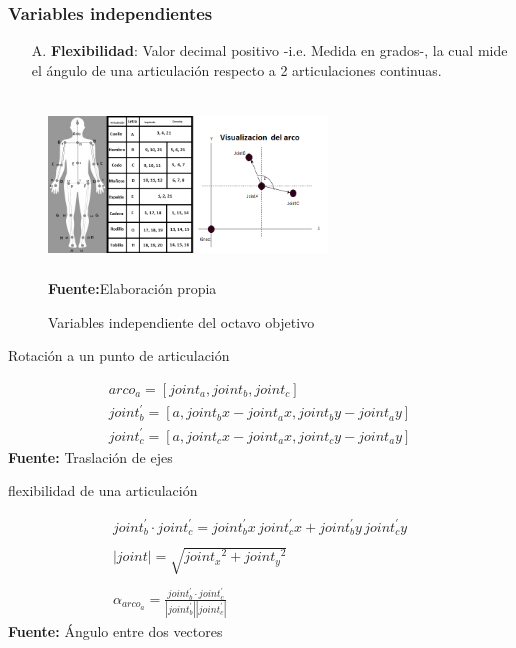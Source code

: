 \subsubsection{Variables independientes} \label{vr:8oi:indep}
\begin{enumerate}
	\item[A.] \textbf{Flexibilidad}: Valor decimal positivo -i.e. Medida en grados-, la cual mide el \'angulo de una articulaci\'on respecto a 2 articulaciones continuas.
\end{enumerate}	
\begin{figure}[H]
	\caption{Variables independiente del octavo  objetivo}
	\label{fig:varidep8}
	\centering
	\includegraphics[width=280px,height=180px]{graphics/EskeletanAngles.png} \\
	\textbf{Fuente:}Elaboraci\'on propia 
\end{figure}
\begin{formula}[h]
	\centering
	\caption{Rotaci\'on a un punto de articulaci\'on}
	\label{frm:rotEq}
	\begin{equation}
\begin{matrix}
arco_{a} = [joint_{a},joint_{b},joint_{c}]\\ 
joint_{b}^{'} = [a,joint_{b}x-joint_{a}x, joint_{b}y-joint_{a}y]\\ 
joint_{c}^{'} = [a,joint_{c}x-joint_{a}x, joint_{c}y-joint_{a}y]
\end{matrix}
	\end{equation}
	\textbf{Fuente:} Traslaci\'on de ejes \cite[p.~982]{aguilar2009matematicas}
\end{formula}  
\begin{formula}[h]
	\centering
	\caption{flexibilidad de una articulaci\'on}
	\label{frm:angleArc}
	\begin{equation}
\begin{matrix}
joint_{b}^{'} \cdot joint_{c}^{'}=  joint_{b}^{'}x \, joint_{c}^{'}x + joint_{b}^{'}y \, joint_{c}^{'}y \\ 
\\ 
\left | joint \right |= \sqrt{ {joint_{x}}^{2} + {joint_{y}}^{2}}\\ 
\\ 
\alpha _{arco_{a}} = \frac{joint_{b}^{'} \cdot joint_{c}^{'}}{\left | joint_{b}^{'}\right |\left |  joint_{c}^{'}\right |}
\end{matrix}
	\end{equation}
	\textbf{Fuente:} \'Angulo entre dos vectores \cite[p.~591]{stewart2013precalculus}
\end{formula}  
